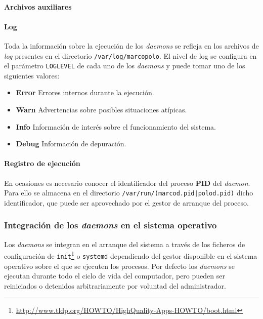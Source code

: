 
\paragraph{Archivos auxiliares}

\paragraph{Log}
Toda la información sobre la ejecución de los \textit{daemons} se refleja en los archivos de \textit{log} presentes en el directorio \texttt{/var/log/marcopolo}. El nivel de log se configura en el parámetro \texttt{LOGLEVEL} de cada uno de los \textit{daemons} y puede tomar uno de los siguientes valores:

\begin{itemize}
\item \textbf{Error} Errores internos durante la ejecución.
\item \textbf{Warn} Advertencias sobre posibles situaciones atípicas.
\item \textbf{Info} Información de interés sobre el funcionamiento del sistema.
\item \textbf{Debug} Información de depuración.
\end{itemize}


\paragraph{Registro de ejecución}

En ocasiones es necesario conocer el identificador del proceso \textbf{PID} del \textit{daemon}. Para ello se almacena en el directorio \texttt{/var/run/(marcod.pid|polod.pid)} dicho identificador, que puede ser aprovechado por el gestor de arranque del proceso.

\subsubsection{Integración de los \textit{daemons} en el sistema operativo}

Los \textit{daemons} se integran en el arranque del sistema a través de los ficheros de configuración de \texttt{init}\footnote{\href{http://www.tldp.org/HOWTO/HighQuality-Apps-HOWTO/boot.html}{http://www.tldp.org/HOWTO/HighQuality-Apps-HOWTO/boot.html}} o \texttt{systemd} dependiendo del gestor disponible en el sistema operativo sobre el que se ejecuten los procesos. Por defecto los \textit{daemons} se ejecutan durante todo el ciclo de vida del computador, pero pueden ser reiniciados o detenidos arbitrariamente por voluntad del administrador.

